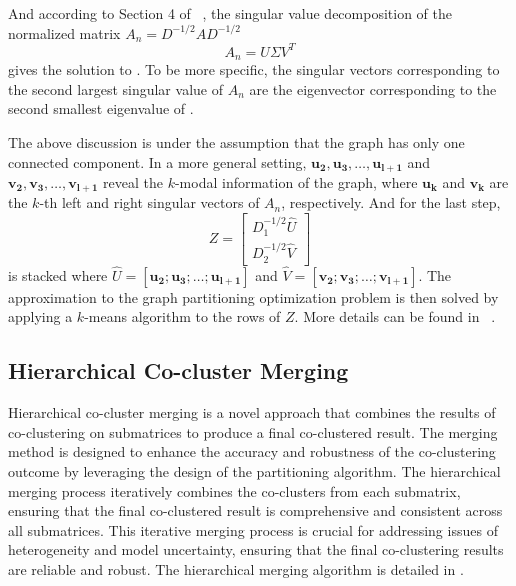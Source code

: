 \documentclass[journal]{IEEEtran}
\renewcommand{\cite}[1]{~\autocite{#1}}
\begin{document}
And according to Section 4 of \cite{dhillon2001CoclusteringDocumentsWords}, the singular value decomposition of the normalized matrix $A_n = D^{-1/2} A D^{-1/2}$
$$A_n = U \Sigma V^T$$
gives the solution to . To be more specific, the singular vectors corresponding to the second largest singular value of $A_n$ are the eigenvector corresponding to the second smallest eigenvalue of .

The above discussion is under the assumption that the graph has only one connected component. In a more general setting, $\mathbf{u_2}, \mathbf{u_3}, \ldots, \mathbf{u_{l+1}}$ and $\mathbf{v_2}, \mathbf{v_3}, \ldots, \mathbf{v_{l+1}}$ reveal the $k$-modal information of the graph, where $\mathbf{u_k}$ and $\mathbf{v_k}$ are the $k$-th left and right singular vectors of $A_n$, respectively. And for the last step,
$$ Z = \begin{bmatrix} D_1^{-1/2} \hat{U} \\ D_2^{-1/2} \hat{V} \end{bmatrix} $$
is stacked where $\hat{U} = [\mathbf{u_2}; \mathbf{u_3}; \ldots; \mathbf{u_{l+1}}]$ and $\hat{V} = [\mathbf{v_2}; \mathbf{v_3}; \ldots; \mathbf{v_{l+1}}]$. The approximation to the graph partitioning optimization problem is then solved by applying a $k$-means algorithm to the rows of $Z$. More details can be found in \cite{dhillon2001CoclusteringDocumentsWords}.

\subsection{Hierarchical Co-cluster Merging}

Hierarchical co-cluster merging is a novel approach that combines the results of co-clustering on submatrices to produce a final co-clustered result. The merging method is designed to enhance the accuracy and robustness of the co-clustering outcome by leveraging the design of the partitioning algorithm. The hierarchical merging process iteratively combines the co-clusters from each submatrix, ensuring that the final co-clustered result is comprehensive and consistent across all submatrices. This iterative merging process is crucial for addressing issues of heterogeneity and model uncertainty, ensuring that the final co-clustering results are reliable and robust.
The hierarchical merging algorithm is detailed in .
\end{document}
